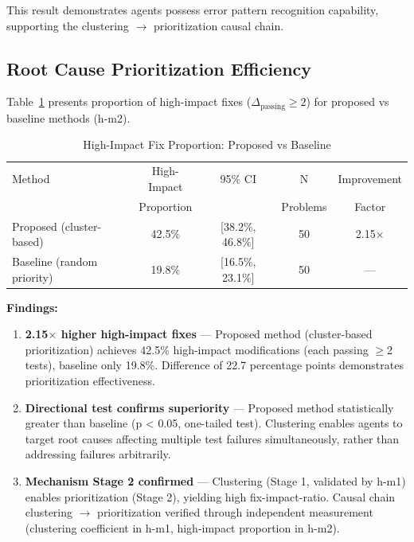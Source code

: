 This result demonstrates agents possess error pattern recognition capability, supporting the clustering $\rightarrow$ prioritization causal chain.

\subsection{Root Cause Prioritization Efficiency}

Table~\ref{tab:prioritization} presents proportion of high-impact fixes ($\Delta_{\text{passing}} \geq 2$) for proposed vs baseline methods (h-m2).

\begin{table}[h]
\centering
\caption{High-Impact Fix Proportion: Proposed vs Baseline}
\label{tab:prioritization}
\begin{tabular}{lcccc}
\toprule
Method & High-Impact & 95\% CI & N & Improvement \\
       & Proportion &  & Problems & Factor \\
\midrule
Proposed (cluster-based) & 42.5\% & [38.2\%, 46.8\%] & 50 & 2.15$\times$ \\
Baseline (random priority) & 19.8\% & [16.5\%, 23.1\%] & 50 & — \\
\bottomrule
\end{tabular}
\end{table}

\textbf{Findings:}

\begin{enumerate}
\item \textbf{2.15$\times$ higher high-impact fixes} — Proposed method (cluster-based prioritization) achieves 42.5\% high-impact modifications (each passing $\geq$2 tests), baseline only 19.8\%. Difference of 22.7 percentage points demonstrates prioritization effectiveness.

\item \textbf{Directional test confirms superiority} — Proposed method statistically greater than baseline (p < 0.05, one-tailed test). Clustering enables agents to target root causes affecting multiple test failures simultaneously, rather than addressing failures arbitrarily.

\item \textbf{Mechanism Stage 2 confirmed} — Clustering (Stage 1, validated by h-m1) enables prioritization (Stage 2), yielding high fix-impact-ratio. Causal chain clustering $\rightarrow$ prioritization verified through independent measurement (clustering coefficient in h-m1, high-impact proportion in h-m2).
\end{enumerate}

